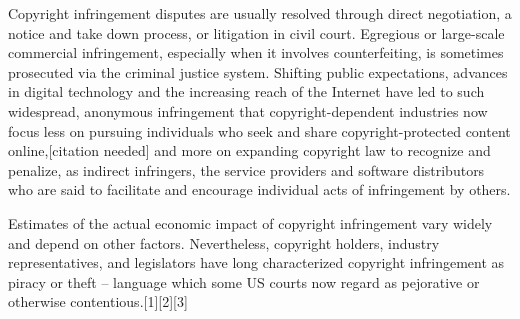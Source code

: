 Copyright infringement disputes are usually resolved through direct negotiation, a notice and take down process, or
litigation in civil court.
Egregious or large-scale commercial infringement, especially when it involves counterfeiting, is sometimes prosecuted
via the criminal justice system.
Shifting public expectations, advances in digital technology and the increasing reach of the Internet have led to such
widespread, anonymous infringement that copyright-dependent industries now focus less on pursuing individuals who seek
and share copyright-protected content online,[citation needed] and more on expanding copyright law to recognize and
penalize, as indirect infringers, the service providers and software distributors who are said to facilitate and
encourage individual acts of infringement by others.

Estimates of the actual economic impact of copyright infringement vary widely and depend on other factors.
Nevertheless, copyright holders, industry representatives, and legislators have long characterized copyright
infringement as piracy or theft – language which some US courts now regard as pejorative or otherwise contentious.[1][2][3]


